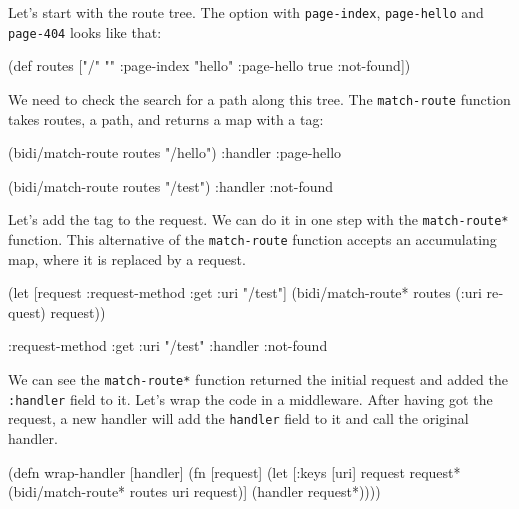 Let's start with the route tree. The option with \verb|page-index|, \verb|page-hello| and \verb|page-404| looks like that:

\begin{english}
\begin{clojure}
(def routes
["/" {""      :page-index
"hello" :page-hello
true    :not-found}])
\end{clojure}
\end{english}


We need to check the search for a path along this tree. The \verb|match-route| function takes routes, a path, and returns a map with a tag:

\begin{english}
\begin{clojure}
(bidi/match-route routes "/hello")
{:handler :page-hello}

(bidi/match-route routes "/test")
{:handler :not-found}
\end{clojure}
\end{english}


Let's add the tag to the request. We can do it in one step with the \verb|match-route*| function. This alternative of the \verb|match-route| function accepts an accumulating map, where it is replaced by a request.

\begin{english}
\begin{clojure}
(let [request {:request-method :get
:uri "/test"}]
(bidi/match-route* routes (:uri request) request))

{:request-method :get
:uri "/test"
:handler :not-found}
\end{clojure}
\end{english}

We can see the \verb|match-route*| function returned the initial request and added the \verb|:handler| field to it. Let's wrap the code in a middleware. After having got the request, a new handler will add the \verb|handler| field to it and call the original handler.

\begin{english}
\begin{clojure}
(defn wrap-handler [handler]
(fn [request]
(let [{:keys [uri]} request
request* (bidi/match-route* routes uri request)]
(handler request*))))
\end{clojure}
\end{english}

